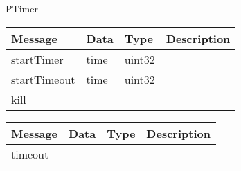  {PTimer}

\begin{tabular}[ht]{|l|l|l|p{8cm}|}
\hline
Message & Data & Type & Description\\
\hline
startTimer &  time  &  uint32  & \\
\hline
startTimeout &  time  &  uint32  & \\
\hline
kill &  &  & \\
\hline
\end{tabular}
\begin{tabular}[ht]{|l|l|l|p{8cm}|}
\hline
Message & Data & Type & Description\\
\hline
timeout &  &  & \\
\hline
\end{tabular}
